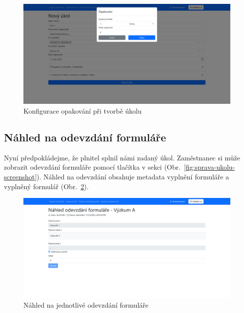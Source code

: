 \begin{figure}[H]
    \includegraphics[width=\textwidth]{../img/screenshots/tvorba-ukolu-opakovani}
    \caption{Konfigurace opakování při tvorbě úkolu}\label{fig:tvorba-ukolu-opakovani-screenshot}
\end{figure}

\subsection{Náhled na odevzdání formuláře}\label{subsec:nahled-odevzdani-formulare}

Nyní předpokládejme, že plnitel splnil námi zadaný úkol.
Zaměstnanec si může zobrazit odevzdání formuláře pomocí tlačítka  v sekci  (Obr.\ \ref{fig:sprava-ukolu-screenshot}).
Náhled na odevzdání obsahuje metadata vyplnění formuláře a vyplněný formulář (Obr.\ \ref{fig:nahled-odevzdani-zamestnanec-screenshot}).

\begin{figure}[H]
    \includegraphics[width=\textwidth]{../img/screenshots/nahled-odevzdani-zamestnanec}
    \caption{Náhled na jednotlivé odevzdání formuláře}\label{fig:nahled-odevzdani-zamestnanec-screenshot}
\end{figure}

